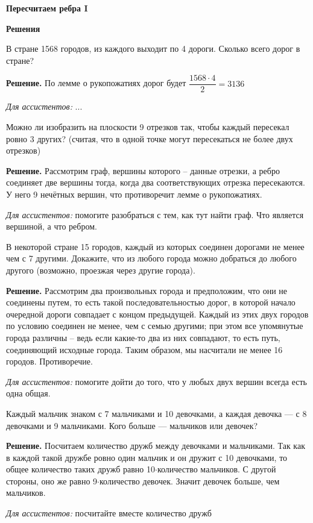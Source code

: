 \centerline{\bf \Huge Пересчитаем ребра I}
\centerline{\bf \Huge Решения}

В стране 1568 городов, из каждого выходит по 4 дороги. Сколько всего дорог в стране?

\textbf{Решение.} По лемме о рукопожатиях дорог будет $\dfrac{1568\cdot4}{2} = 3136$

\textit{Для ассистентов:} ...

Можно ли изобразить на плоскости 9 отрезков так, чтобы каждый пересекал ровно 3 других? (считая, что в одной точке могут пересекаться не более двух отрезков)

\textbf{Решение.}
Рассмотрим граф, вершины которого – данные отрезки, а ребро соединяет две вершины тогда, когда два соответствующих отрезка пересекаются. У него 9 нечётных вершин, что противоречит лемме о рукопожатиях.

\textit{Для ассистентов:} помогите разобраться с тем, как тут найти граф. Что является вершиной, а что ребром.

В некоторой стране 15 городов, каждый из которых соединен дорогами не менее чем с 7 другими. Докажите, что из любого города можно добраться до любого другого (возможно, проезжая через другие города).

\textbf{Решение.}
Рассмотрим два произвольных города и предположим, что они не соединены путем, то есть такой последовательностью дорог, в которой начало очередной дороги совпадает с концом предыдущей. Каждый из этих двух городов по условию соединен не менее, чем с семью другими; при этом все упомянутые города различны – ведь если какие-то два из них совпадают, то есть путь, соединяющий исходные города. Таким образом, мы насчитали не менее 16 городов. Противоречие.

\textit{Для ассистентов:} помогите дойти до того, что у любых двух вершин всегда есть одна общая.

Каждый мальчик знаком с 7 мальчиками и 10 девочками, а каждая девочка — с 8 девочками и 9 мальчиками. Кого больше — мальчиков или девочек?

\textbf{Решение.}
Посчитаем количество дружб между девочками и мальчиками. Так как в каждой такой дружбе ровно один мальчик и он дружит с 10   девочками, то общее количество таких дружб равно 10$\cdot$количество мальчиков. С другой стороны, оно же равно 9$\cdot$количество девочек. Значит девочек больше, чем мальчиков.

\textit{Для ассистентов:} посчитайте вместе количество дружб

